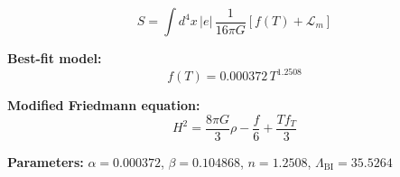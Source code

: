 
\begin{equation}
  S = \int d^4x \, |e| \, \frac{1}{16\pi G} \left[ f(T) + \mathcal{L}_m \right]
\end{equation}

\textbf{Best-fit model:}
\begin{equation}
  f(T) = 0.000372 \, T^{1.2508}
\end{equation}

\textbf{Modified Friedmann equation:}
\begin{equation}
  H^2 = \frac{8\pi G}{3} \rho - \frac{f}{6} + \frac{T f_T}{3}
\end{equation}

\textbf{Parameters:}
$\alpha = 0.000372$, \quad
$\beta = 0.104868$, \quad
$n = 1.2508$, \quad
$\Lambda_{\text{BI}} = 35.5264$